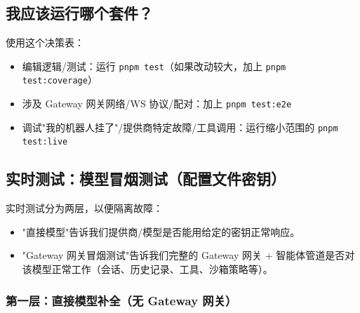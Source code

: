 \subsection{我应该运行哪个套件？}


使用这个决策表：

\begin{itemize}
  \item 编辑逻辑/测试：运行 \texttt{pnpm test}（如果改动较大，加上 \texttt{pnpm test:coverage}）
  \item 涉及 Gateway 网关网络/WS 协议/配对：加上 \texttt{pnpm test:e2e}
  \item 调试"我的机器人挂了"/提供商特定故障/工具调用：运行缩小范围的 \texttt{pnpm test:live}
\end{itemize}


\subsection{实时测试：模型冒烟测试（配置文件密钥）}


实时测试分为两层，以便隔离故障：

\begin{itemize}
  \item "直接模型"告诉我们提供商/模型是否能用给定的密钥正常响应。
  \item "Gateway 网关冒烟测试"告诉我们完整的 Gateway 网关 + 智能体管道是否对该模型正常工作（会话、历史记录、工具、沙箱策略等）。
\end{itemize}


\subsubsection{第一层：直接模型补全（无 Gateway 网关）}


